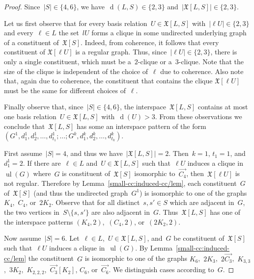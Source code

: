 \documentclass[english,a4paper]{article}
\theoremstyle{plain}
\theoremstyle{definition}
\newcommand{\abs}[1]{| #1 |}
\newcommand{\coherentConfig}{\ensuremath{\mathfrak{X}}}
\newcommand{\interspace}[2]{\ensuremath{\coherentConfig[#1,#2]}}
\newcommand{\inducedCC}[1]{\ensuremath{\coherentConfig[#1]}}
\newcommand{\intDegree}[1]{\ensuremath{\Deg \left( #1 \right)}}
\newcommand{\minimalDegree}[2]{\Deg(#1,#2)}
\DeclareMathOperator*{\ul}{ul}
\DeclareMathOperator{\Deg}{d}
\newcommand{\ipfourClique}  {\ensuremath{(\clique{4},2)}}
\newcommand{\ipfourMatching}{\ensuremath{(\disjointCliques{2}{2},2)}}
\newcommand{\ipfourCycle}   {\ensuremath{(\cycle{4},2)}}
\newcommand{\clique}[1]{\ensuremath{K_{#1}}}
\newcommand{\cycle}[1]{\ensuremath{C_{#1}}}
\newcommand{\disjointCliques}[2]{\ensuremath{#1 \clique{#2}}}
\begin{document}
\begin{proof}
    Since~$\abs{S} \in \{4,6\}$, we have~$\minimalDegree{L}{S} \in \{2,3\}$ and~$\abs{\interspace{L}{S}} \in \{2,3\}$.

    Let us first observe that for every basis relation~$U\in \interspace{L}{S}$ with~$|\ell U|\in \{2,3\}$ and every~$\ell \in L$ the set~$lU$ forms a clique in some undirected underlying graph of a constituent of~$\inducedCC{S}$. Indeed, from coherence, it follows that every constituent of $\inducedCC{\ell U}$ is a regular graph. Thus, since~$|\ell U|\in \{2,3\}$, there is only a single constituent, which must be a~$2$-clique or a~$3$-clique. Note that the size of the clique is independent of the choice of~$\ell$ due to coherence. Also note that, again due to coherence, the constituent that contains the clique $\inducedCC{\ell U}$ must be the same for different choices of~$\ell$.

    Finally observe that, since~$\abs{S} \in \{4,6\}$, the interspace~$\interspace{L}{S}$ contains at most one basis relation~$U \in \interspace{L}{S}$ with~$\intDegree{U} >3$.
    From these observations we conclude that~$\interspace{L}{S}$ has some an interspace pattern of the form $(G^1, d^1_1, d^1_2, \dots, d^1_{t_1}; \dots; G^k, d^k_1, d^k_2, \dots, d^k_{t_k})$.

    First assume~$\abs{S} = 4$, and thus we have~$\abs{\interspace{L}{S}} = 2$.
    Then~$k = 1$, $t_1 = 1$, and~$d^1_1 = 2$.
    If there are~$\ell \in L$ and~$U \in \interspace{L}{S}$ such that~$\ell U$ induces a clique in~$\ul(G)$ where~$G$ is constituent of~$\inducedCC{S}$ isomorphic to~$\overrightarrow{C_4}$, then~$\inducedCC{\ell U}$ is not regular.
    Therefore by Lemma~\ref{small-cc:induced-cc/lem}, each constituent~$G$ of~$\inducedCC{S}$ (and thus the undirected graph~$G^1$) is isomorphic to one of the graphs
    $\clique{4}$,~$\cycle{4}$, or~$\disjointCliques{2}{2}$.
    Observe that for all distinct~$s,s' \in S$ which are adjacent in~$G$, the two vertices in~$S \setminus \{s,s'\}$ are also adjacent in~$G$.
    Thus~$\interspace{L}{S}$ has one of the interspace patterns
    $\ipfourClique$,~$\ipfourCycle$, or~$\ipfourMatching$.

    Now assume~$\abs{S} = 6$.
    Let~$\ell \in L$,~$U \in \interspace{L}{S}$, and~$G$ be constituent of~$\inducedCC{S}$ such that~$\ell U$ induces a clique in~$\ul(G)$.
    By Lemma~\ref{small-cc:induced-cc/lem} the constituent~$G$ is isomorphic to one of the graphs $K_6$,~$2 K_3$,~$2\overrightarrow{C_3}$,~$K_{3,3}$,~$3 K_2$,~$K_{2,2,2}$,~$\overrightarrow{C_3}[K_2]$,
    $C_6$, or~$\overrightarrow{C_6}$.
    We distinguish cases according to~$G$.


\end{proof}
\end{document}
